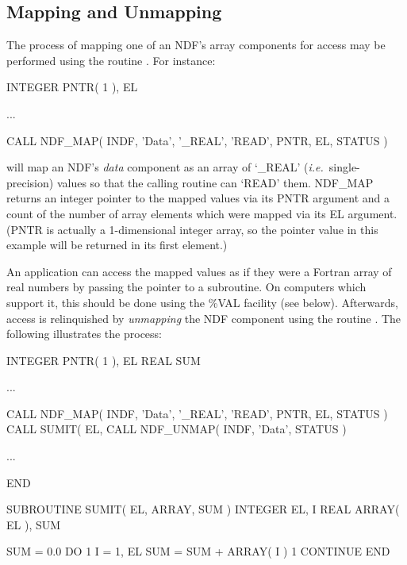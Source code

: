 \documentclass[twoside,11pt,nolof]{starlink}
\providecommand{\st}[1]{{\emph{#1}}}
\begin{document}
\subsection{\label{ss:map}Mapping and Unmapping}

The process of mapping one of an NDF's array components for access may be
performed using the routine .
For instance:

\small
\begin{terminalv}
      INTEGER PNTR( 1 ), EL

      ...

      CALL NDF_MAP( INDF, 'Data', '_REAL', 'READ', PNTR, EL, STATUS )
\end{terminalv}
\normalsize

will map an NDF's \st{data\/} component as an array of `\_REAL' (\st{i.e.}\
single-precision) values so that the calling routine can `READ' them.
NDF\_MAP returns an integer pointer to the mapped values via its PNTR
argument and a count of the number of array elements which were mapped via
its EL argument.
(PNTR is actually a 1-dimensional integer array, so the pointer value in
this example will be returned in its first element.)

An application can access the mapped values as if they were a Fortran
array of real numbers by passing the pointer to a subroutine.  On
computers which support it, this should be done using the \%VAL
facility (see below).  Afterwards, access is relinquished by
\st{unmapping\/} the NDF component using the routine
.  The
following illustrates the process:

\small
\begin{terminalv}
      INTEGER PNTR( 1 ), EL
      REAL SUM

      ...

      CALL NDF_MAP( INDF, 'Data', '_REAL', 'READ', PNTR, EL, STATUS )
      CALL SUMIT( EL, %
      CALL NDF_UNMAP( INDF, 'Data', STATUS )

      ...

      END


      SUBROUTINE SUMIT( EL, ARRAY, SUM )
      INTEGER EL, I
      REAL ARRAY( EL ), SUM

      SUM = 0.0
      DO 1 I = 1, EL
         SUM = SUM + ARRAY( I )
 1    CONTINUE
      END
\end{terminalv}
\normalsize
\end{document}
